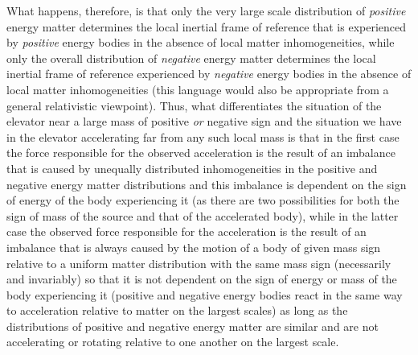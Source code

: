 \documentclass[notitlepage,12pt]{report}
\begin{document}
What happens, therefore, is that only the very large scale distribution of \textit{positive} energy matter determines the local inertial frame of reference that is experienced by \textit{positive} energy bodies in the absence of local matter inhomogeneities, while only the overall distribution of \textit{negative} energy matter determines the local inertial frame of reference experienced by \textit{negative} energy bodies in the absence of local matter inhomogeneities (this language would also be appropriate from a general relativistic viewpoint). Thus, what differentiates the situation of the elevator near a large mass of positive \textit{or} negative sign and the situation we have in the elevator accelerating far from any such local mass is that in the first case the force responsible for the observed acceleration is the result of an imbalance that is caused by unequally distributed inhomogeneities in the positive and negative energy matter distributions and this imbalance is dependent on the sign of energy of the body experiencing it (as there are two possibilities for both the sign of mass of the source and that of the accelerated body), while in the latter case the observed force responsible for the acceleration is the result of an imbalance that is always caused by the motion of a body of given mass sign relative to a uniform matter distribution with the same mass sign (necessarily and invariably) so that it is not dependent on the sign of energy or mass of the body experiencing it (positive and negative energy bodies react in the same way to acceleration relative to matter on the largest scales) as long as the distributions of positive and negative energy matter are similar and are not accelerating or rotating relative to one another on the largest scale.
\end{document}
